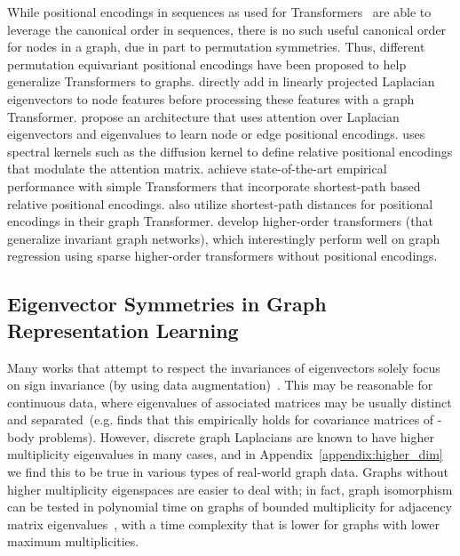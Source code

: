 \documentclass{article} \usepackage{iclr2023_conference,times}
\begin{document}
While positional encodings in sequences as used for Transformers~\citep{vaswani2017attention} are able to leverage the canonical order in sequences, there is no such useful canonical order for nodes in a graph, due in part to permutation symmetries. Thus, different permutation equivariant positional encodings have been proposed to help generalize Transformers to graphs. \cite{dwivedi2020generalization} directly add in linearly projected Laplacian eigenvectors to node features before processing these features with a graph Transformer. \cite{kreuzer2021rethinking} propose an architecture that uses attention over Laplacian eigenvectors and eigenvalues to learn node or edge positional encodings. \cite{mialon2021graphit} uses spectral kernels such as the diffusion kernel to define relative positional encodings that modulate the attention matrix. \cite{ying2021transformers} achieve state-of-the-art empirical performance with simple Transformers that incorporate shortest-path based relative positional encodings. \cite{zhang2020graph} also utilize shortest-path distances for positional encodings in their graph Transformer. \cite{kim2021transformers} develop higher-order transformers (that generalize invariant graph networks), which interestingly perform well on graph regression using sparse higher-order transformers without positional encodings.

\subsection{Eigenvector Symmetries in Graph Representation Learning}\label{appendix:more_related_eigvec}

Many works that attempt to respect the invariances of eigenvectors solely focus on sign invariance (by using data augmentation)~\citep{dwivedi2020benchmarking, dwivedi2020generalization, dwivedi2022graph, kreuzer2021rethinking}. This may be reasonable for continuous data, where eigenvalues of associated matrices may be usually distinct and separated~(e.g. \cite{puny2021frame} finds that this empirically holds for covariance matrices of -body problems). However, discrete graph Laplacians are known to have higher multiplicity eigenvalues in many cases, and in Appendix~\ref{appendix:higher_dim} we find this to be true in various types of real-world graph data. Graphs without higher multiplicity eigenspaces are easier to deal with; in fact, graph isomorphism can be tested in polynomial time on graphs of bounded multiplicity for adjacency matrix eigenvalues~\citep{babai1982isomorphism, LeightonMiller79}, with a time complexity that is lower for graphs with lower maximum multiplicities.
\end{document}
